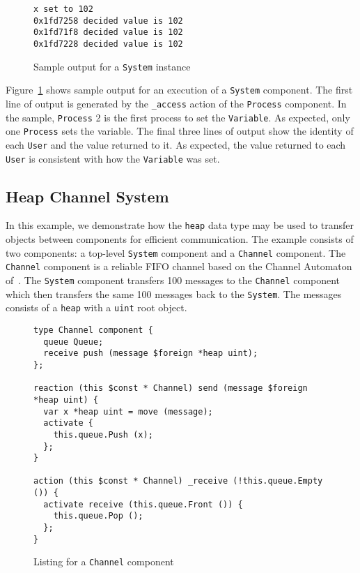 \begin{figure}
\begin{verbatim}
x set to 102
0x1fd7258 decided value is 102
0x1fd71f8 decided value is 102
0x1fd7228 decided value is 102
\end{verbatim}
\cprotect\caption{Sample output for a \verb+System+ instance}
\label{system_output}
\end{figure}

Figure~\ref{system_output} shows sample output for an execution of a \verb+System+ component.
The first line of output is generated by the \verb+_access+ action of the \verb+Process+ component.
In the sample, \verb+Process+ 2 is the first process to set the \verb+Variable+.
As expected, only one \verb+Process+ sets the variable.
The final three lines of output show the identity of each \verb+User+ and the value returned to it.
As expected, the value returned to each \verb+User+ is consistent with how the \verb+Variable+ was set.

\subsection{Heap Channel System}

In this example, we demonstrate how the \verb+heap+ data type may be used to transfer objects between components for efficient communication.
The example consists of two components:  a top-level \verb+System+ component and a \verb+Channel+ component.
The \verb+Channel+ component is a reliable FIFO channel based on the Channel Automaton of~\cite{nancy1996distributed}.
The \verb+System+ component transfers 100 messages to the \verb+Channel+ component which then transfers the same 100 messages back to the \verb+System+.
The messages consists of a \verb+heap+ with a \verb+uint+ root object.

\begin{figure}
\begin{verbatim}
type Channel component {
  queue Queue;
  receive push (message $foreign *heap uint);
};

reaction (this $const * Channel) send (message $foreign *heap uint) {
  var x *heap uint = move (message);
  activate {
    this.queue.Push (x);
  };
}

action (this $const * Channel) _receive (!this.queue.Empty ()) {
  activate receive (this.queue.Front ()) {
    this.queue.Pop ();
  };
}
\end{verbatim}
\cprotect\caption{Listing for a \verb+Channel+ component}
\label{channel_listing}
\end{figure}

